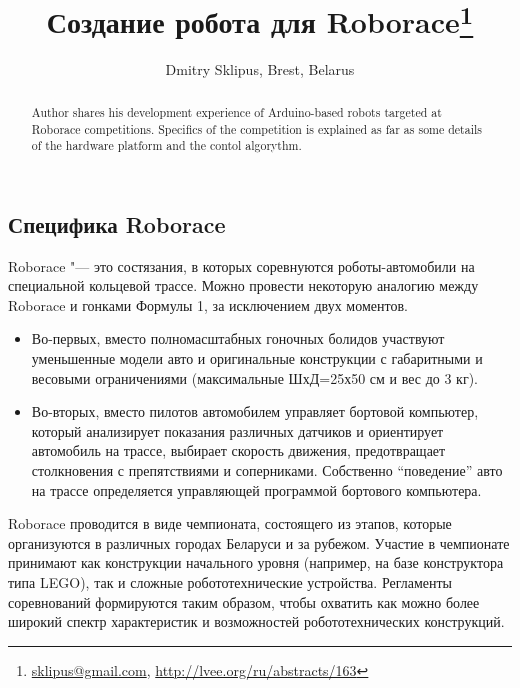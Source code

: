 \documentclass[10pt, a5paper]{article}
\begin{document}
\title{Создание робота для Roborace\footnote{\url{sklipus@gmail.com}, \url{http://lvee.org/ru/abstracts/163}}}
\author{Dmitry Sklipus, Brest, Belarus}
\maketitle
\begin{abstract}
Author shares his development experience of Arduino-based robots targeted at Roborace competitions. Specifics of the competition is explained as far as some details of the hardware platform and the contol algorythm.
\end{abstract}
\subsection*{Специфика Roborace}

Roborace "--- это состязания, в которых соревнуются \linebreak роботы-автомобили на специальной кольцевой трассе. Можно провести некоторую аналогию между Roborace и гонками Формулы 1, за исключением двух моментов.

\begin{itemize}
  \item Во-первых, вместо полномасштабных гоночных болидов участвуют уменьшенные модели авто и оригинальные конструкции с габаритными и весовыми ограничениями (максимальные ШхД=25х50 см и вес до 3 кг).
  \item Во-вторых, вместо пилотов автомобилем управляет бортовой компьютер, который анализирует показания различных датчиков и ориентирует автомобиль на трассе, выбирает скорость движения, предотвращает столкновения с препятствиями и соперниками. Собственно “поведение” авто на трассе определяется управляющей программой бортового компьютера.
\end{itemize}

Roborace проводится в виде чемпионата, состоящего из этапов, которые организуются в различных городах Беларуси и за рубежом. Участие в чемпионате принимают как конструкции начального уровня (например, на базе конструктора типа LEGO), так и сложные робототехнические устройства. Регламенты соревнований формируются таким образом, чтобы охватить как можно более широкий спектр характеристик и возможностей робототехнических конструкций.
\end{document}
